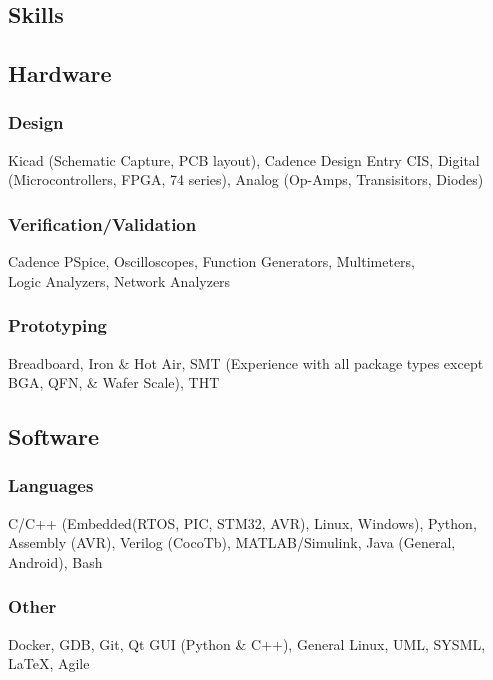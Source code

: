 \documentclass{article}
\begin{document}
\begin{spacing}{.5}
\section{Skills}
	\subsection{Hardware}
		\subsubsection{Design} \large{\hspace*{2pt} Kicad} \small{(Schematic Capture, PCB layout),} \large{Cadence Design Entry CIS, Digital} \small{(Microcontrollers, FPGA, 74 series), } \hspace*{.45cm}  \large{Analog} \small{(Op-Amps, Transisitors, Diodes)}
		\subsubsection{Verification/Validation} \large{\hspace*{2pt} Cadence PSpice, Oscilloscopes, Function Generators, Multimeters,\\ \hspace*{.45cm} Logic Analyzers, Network Analyzers}
		\subsubsection{Prototyping} \large{\hspace*{2pt} Breadboard, Iron \& Hot Air, SMT} \small{(Experience with all package types except BGA, QFN, \& Wafer Scale),} \large{ \hspace*{.45cm} THT}
\subsection{Software}
		\subsubsection{Languages} \large{\hspace*{2pt} C/C++} \small{(Embedded(RTOS, PIC, STM32, AVR), Linux, Windows),}\large{ Python, Assembly} \small{(AVR), } \large{Verilog} \small{(CocoTb), } \hspace*{.45cm}\large{MATLAB/Simulink, Java} \small{(General, Android),} \large{ Bash}
		\subsubsection{Other} \large{\hspace*{2pt} Docker, GDB, Git, Qt GUI} \small{(Python \& C++), } \large{General Linux, UML, SYSML, \LaTeX, Agile}


\end{spacing}
\end{document}
